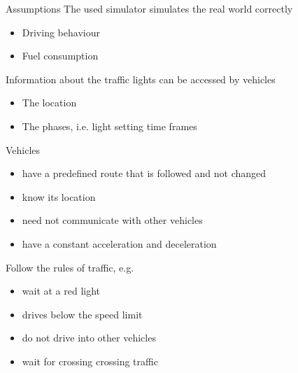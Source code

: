 \begin{frame}{Assumptions}
The used simulator simulates the real world correctly
\begin{itemize}
\item Driving behaviour
\item Fuel consumption
\end{itemize}
Information about the traffic lights can be accessed by vehicles
\begin{itemize}
\item The location
\item The phases, i.e. light setting time frames 
\end{itemize}

Vehicles 
\begin{itemize}
\item have a predefined route that is followed and not changed
\item know its location
\item need not communicate with other vehicles
\item have a constant acceleration and deceleration
\end{itemize}

Follow the rules of traffic, e.g. 
\begin{itemize}
\item wait at a red light
\item drives below the speed limit
\item do not drive into other vehicles
\item wait for crossing crossing traffic
\end{itemize}

\end{frame}